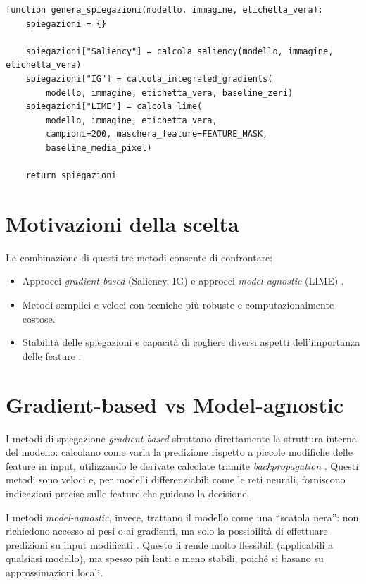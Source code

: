 \documentclass[12pt,a4paper,oneside]{report}
\numberwithin{figure}{chapter}
\numberwithin{table}{chapter}
\begin{document}
\begin{lstlisting}[caption={Generazione delle spiegazioni}, label={lst:xai_generation}]
function genera_spiegazioni(modello, immagine, etichetta_vera):
    spiegazioni = {}
    
    spiegazioni["Saliency"] = calcola_saliency(modello, immagine, etichetta_vera)
    spiegazioni["IG"] = calcola_integrated_gradients(
        modello, immagine, etichetta_vera, baseline_zeri)
    spiegazioni["LIME"] = calcola_lime(
        modello, immagine, etichetta_vera,
        campioni=200, maschera_feature=FEATURE_MASK,
        baseline_media_pixel)
    
    return spiegazioni
\end{lstlisting}

\section{Motivazioni della scelta}
La combinazione di questi tre metodi consente di confrontare:
\begin{itemize}
      \item Approcci \emph{gradient-based} (Saliency, IG) e approcci \emph{model-agnostic}
            (LIME) \citep{simonyan2014deep,sundararajan2017axiomatic,ribeiro2016lime}.
      \item Metodi semplici e veloci con tecniche più robuste e computazionalmente costose.
      \item Stabilità delle spiegazioni e capacità di cogliere diversi aspetti
            dell’importanza delle feature \citep{samek2016evaluating,guidotti2018survey}.
\end{itemize}

\section{Gradient-based vs Model-agnostic} \label{sec:gradient_vs_model}
I metodi di spiegazione \emph{gradient-based} sfruttano direttamente la
struttura interna del modello: calcolano come varia la predizione rispetto a
piccole modifiche delle feature in input, utilizzando le derivate calcolate
tramite \emph{backpropagation}
\citep{simonyan2014deep,sundararajan2017axiomatic}. Questi metodi sono veloci
e, per modelli differenziabili come le reti neurali, forniscono indicazioni
precise sulle feature che guidano la decisione.

I metodi \emph{model-agnostic}, invece, trattano il modello come una “scatola
nera”: non richiedono accesso ai pesi o ai gradienti, ma solo la possibilità di
effettuare predizioni su input modificati
\citep{ribeiro2016lime,guidotti2018survey}. Questo li rende molto flessibili
(applicabili a qualsiasi modello), ma spesso più lenti e meno stabili, poiché
si basano su approssimazioni locali.
\end{document}
